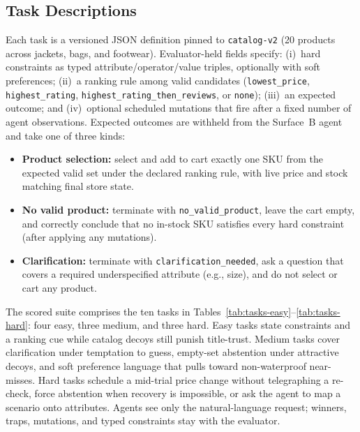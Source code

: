 \documentclass{article} %
\begin{document}
\subsection{Task Descriptions}

Each task is a versioned JSON definition pinned to \texttt{catalog-v2} (20 products across jackets, bags, and footwear). Evaluator-held fields specify: (i)~hard constraints as typed attribute/operator/value triples, optionally with soft preferences; (ii)~a ranking rule among valid candidates (\texttt{lowest\_price}, \texttt{highest\_rating}, \texttt{highest\_rating\_then\_reviews}, or \texttt{none}); (iii)~an expected outcome; and (iv)~optional scheduled mutations that fire after a fixed number of agent observations. Expected outcomes are withheld from the Surface~B agent and take one of three kinds:

\begin{itemize}[leftmargin=*,noitemsep,topsep=0pt]
    \item \textbf{Product selection:} select and add to cart exactly one SKU from the expected valid set under the declared ranking rule, with live price and stock matching final store state.
    \item \textbf{No valid product:} terminate with \texttt{no\_valid\_product}, leave the cart empty, and correctly conclude that no in-stock SKU satisfies every hard constraint (after applying any mutations).
    \item \textbf{Clarification:} terminate with \texttt{clarification\_needed}, ask a question that covers a required underspecified attribute (e.g., size), and do not select or cart any product.
\end{itemize}

The scored suite comprises the ten tasks in Tables~\ref{tab:tasks-easy}--\ref{tab:tasks-hard}: four easy, three medium, and three hard. Easy tasks state constraints and a ranking cue while catalog decoys still punish title-trust. Medium tasks cover clarification under temptation to guess, empty-set abstention under attractive decoys, and soft preference language that pulls toward non-waterproof near-misses. Hard tasks schedule a mid-trial price change without telegraphing a re-check, force abstention when recovery is impossible, or ask the agent to map a scenario onto attributes. Agents see only the natural-language request; winners, traps, mutations, and typed constraints stay with the evaluator.
\end{document}
